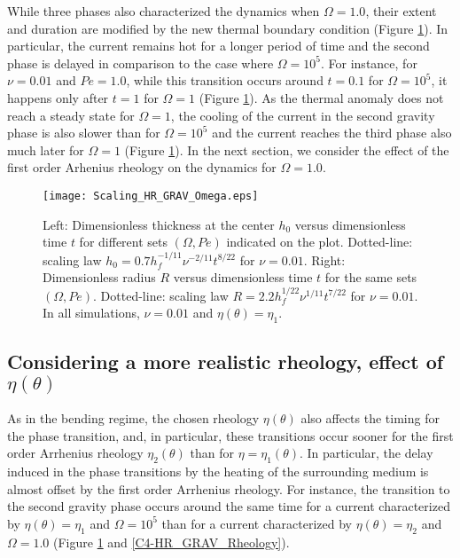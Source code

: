 While three phases also  characterized the dynamics when $\Omega=1.0$,
their extent  and duration  are modified by  the new  thermal boundary
condition (Figure \ref{C4-Scaling_HR_GRAV_Omega}).  In particular, the
current remains hot  for a longer period of time  and the second phase
is  delayed in  comparison  to  the case  where  $\Omega =10^5$.   For
instance, for  $\nu=0.01$ and  $Pe=1.0$, while this  transition occurs
around  $t=0.1$ for  $\Omega=10^5$, it  happens only  after $t=1$  for
$\Omega=1$  (Figure \ref{C4-Scaling_HR_GRAV_Omega}).   As the  thermal
anomaly does not  reach a steady state for $\Omega=1$,  the cooling of
the  current in  the  second gravity  phase is  also  slower than  for
$\Omega=10^5$ and the current reaches  the third phase also much later
for $\Omega=1$  (Figure \ref{C4-Scaling_HR_GRAV_Omega}).  In  the next
section, we consider  the effect of the first  order Arhenius rheology
on the dynamics for $\Omega=1.0$.

\begin{figure}[htpb]
  \begin{center}
    \graphicspath{ {/Users/thorey/Documents/These/Projet/Refroidissement/Skin_Model/Figure/Figure_Heating/} }
    \texttt{[image: Scaling\_HR\_GRAV\_Omega.eps]}
    \caption{Left: Dimensionless thickness at  the center $h_0$ versus
      dimensionless   time  $t$   for  different   sets  $(\Omega,Pe)$
      indicated    on   the    plot.     Dotted-line:   scaling    law
      $h_0=  0.7h_f^{-1/11}\nu^{-2/11}t^{8/22}$  for   $\nu  =  0.01$.
      Right: Dimensionless  radius $R$  versus dimensionless  time $t$
      for  the  same  sets $(\Omega,Pe)$.   Dotted-line:  scaling  law
      $R= 2.2h_f^{1/22}\nu^{1/11}t^{7/22}$  for $\nu = 0.01$.   In all
      simulations, $\nu=0.01$ and $\eta(\theta)=\eta_1$.}
    \label{C4-Scaling_HR_GRAV_Omega}
  \end{center}
\end{figure}

\subsection{Considering   a  more   realistic   rheology,  effect   of
  $\eta(\theta)$}
\label{C4-sec:cons-more-real-1}
 
As  in the  bending regime,  the chosen  rheology $\eta(\theta)$  also
affects the timing for the phase transition, and, in particular, these
transitions  occur  sooner  for  the first  order  Arrhenius  rheology
$\eta_2(\theta)$ than  for $\eta=\eta_1(\theta)$.  In  particular, the
delay  induced  in  the  phase  transitions  by  the  heating  of  the
surrounding  medium is  almost  offset by  the  first order  Arrhenius
rheology.  For  instance, the transition  to the second  gravity phase
occurs  around   the  same  time   for  a  current   characterized  by
$\eta(\theta)   =\eta_1$  and   $\Omega=10^5$  than   for  a   current
characterized  by  $\eta(\theta)  =\eta_2$  and  $\Omega=1.0$  (Figure
\ref{C4-Scaling_HR_GRAV_Omega} and \ref{C4-HR_GRAV_Rheology}).

